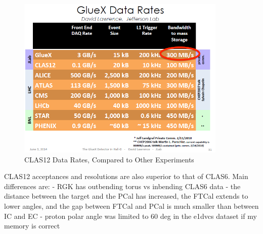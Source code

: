     \begin{figure}[H]
        \centering
        \includegraphics[width=10cm]{Chapters/Ch2-Experiment/clas-12-exp/clas-detectors/other/pics/good_data_rates_slide.png}
        \caption{CLAS12 Data Rates, Compared to Other Experiments }
    \end{figure}

    
CLAS12 acceptances and resolutions are also superior to that of CLAS6. Main differences are:
- RGK has outbending torus vs inbending CLAS6 data
- the distance between the target and the PCal has increased, the FTCal extends to lower angles, and the gap between FTCal and PCal is much smaller than between IC and EC
- proton polar angle was limited to 60 deg in the e1dvcs dataset if my memory is correct





